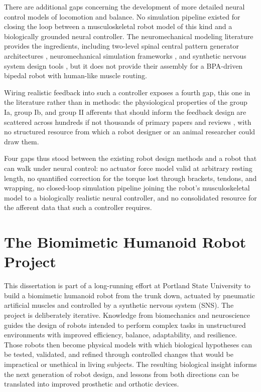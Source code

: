 There are additional gaps concerning the development of more detailed neural control models of locomotion and balance. No simulation pipeline existed for closing the loop between a musculoskeletal robot model of this kind and a biologically grounded neural controller. The neuromechanical modeling literature provides the ingredients, including two-level spinal central pattern generator architectures \citep{rybak_modelling_2006, mccrea_organization_2008}, neuromechanical simulation frameworks \citep{markin_afferent_2010}, and synthetic nervous system design tools \citep{nourse_sns_2023}, but it does not provide their assembly for a BPA-driven bipedal robot with human-like muscle routing. 

Wiring realistic feedback into such a controller exposes a fourth gap, this one in the literature rather than in methods: the physiological properties of the group Ia, group Ib, and group II afferents that should inform the feedback design are scattered across hundreds if not thousands of primary papers and reviews \citep{van_de_crommert_review_1998, windhorst_muscle_2007, windhorst_spinal_2022}, with no structured resource from which a robot designer or an animal researcher could draw them.

Four gaps thus stood between the existing robot design methods and a robot that can walk under neural control: no actuator force model valid at arbitrary resting length, no quantified correction for the torque lost through brackets, tendons, and wrapping, no closed-loop simulation pipeline joining the robot's musculoskeletal model to a biologically realistic neural controller, and no consolidated resource for the afferent data that such a controller requires.

\section{The Biomimetic Humanoid Robot Project}\label{sec:project}

This dissertation is part of a long-running effort at Portland State University to build a biomimetic humanoid robot from the trunk down, actuated by pneumatic artificial muscles and controlled by a synthetic nervous system (SNS). The project is deliberately iterative. Knowledge from biomechanics and neuroscience guides the design of robots intended to perform complex tasks in unstructured environments with improved efficiency, balance, adaptability, and resilience. Those robots then become physical models with which biological hypotheses can be tested, validated, and refined through controlled changes that would be impractical or unethical in living subjects. The resulting biological insight informs the next generation of robot design, and lessons from both directions can be translated into improved prosthetic and orthotic devices.

